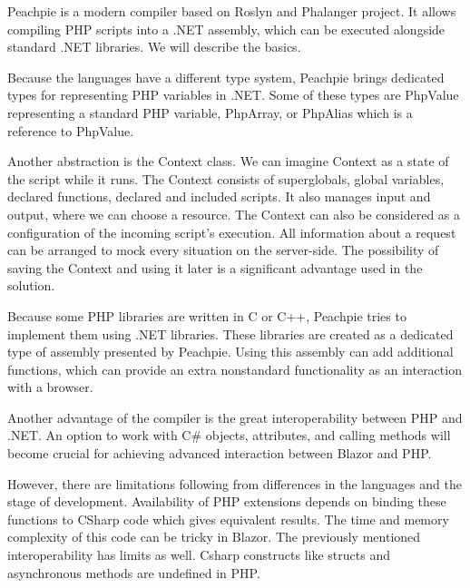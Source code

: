 Peachpie  is a modern compiler based on Roslyn and Phalanger project.
It allows compiling PHP scripts into a .NET assembly, which can be executed alongside standard .NET libraries.
We will describe the basics.
\par
Because the languages have a different type system, Peachpie brings dedicated types for representing PHP variables in .NET.
Some of these types are PhpValue representing a standard PHP variable, PhpArray, or PhpAlias which is a reference to PhpValue.
\par
Another abstraction is the Context class.
We can imagine Context as a state of the script while it runs.
The Context consists of superglobals, global variables, declared functions, declared and included scripts.
It also manages input and output, where we can choose a resource.
The Context can also be considered as a configuration of the incoming script's execution.
All information about a request can be arranged to mock every situation on the server-side.
The possibility of saving the Context and using it later is a significant advantage used in the solution.
\par
Because some PHP libraries are written in C or C++, Peachpie tries to implement them using .NET libraries.
These libraries are created as a dedicated type of assembly presented by Peachpie.
Using this assembly can add additional functions, which can provide an extra nonstandard functionality as an interaction with a browser.
\par
Another advantage of the compiler is the great interoperability between PHP and .NET.
An option to work with C\# objects, attributes, and calling methods will become crucial for achieving advanced interaction between Blazor and PHP.
\par
However, there are limitations following from differences in the languages and the stage of development.
Availability of PHP extensions depends on binding these functions to CSharp code which gives equivalent results. The time and memory complexity of this code can be tricky in Blazor.
The previously mentioned interoperability has limits as well.
Csharp constructs like structs and asynchronous methods are undefined in PHP.


